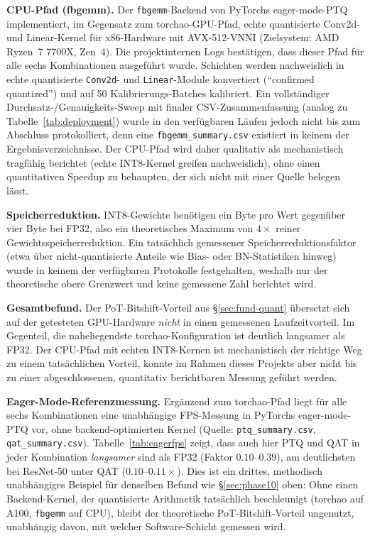 \textbf{CPU-Pfad (fbgemm).} Der \texttt{fbgemm}-Backend von PyTorchs eager-mode-PTQ implementiert, im Gegensatz zum torchao-GPU-Pfad, echte quantisierte Conv2d- und Linear-Kernel für x86-Hardware mit AVX-512-VNNI (Zielsystem: AMD Ryzen~7 7700X, Zen~4). Die projektinternen Logs bestätigen, dass dieser Pfad für alle sechs Kombinationen ausgeführt wurde. Schichten werden nachweislich in echte quantisierte \texttt{Conv2d}- und \texttt{Linear}-Module konvertiert (\enquote{confirmed quantized}) und auf 50 Kalibrierungs-Batches kalibriert. Ein vollständiger Durchsatz-/Genauigkeits-Sweep mit finaler CSV-Zusammenfassung (analog zu Tabelle~\ref{tab:deployment}) wurde in den verfügbaren Läufen jedoch nicht bis zum Abschluss protokolliert, denn eine \texttt{fbgemm\_summary.csv} existiert in keinem der Ergebnisverzeichnisse. Der CPU-Pfad wird daher qualitativ als mechanistisch tragfähig berichtet (echte INT8-Kernel greifen nachweislich), ohne einen quantitativen Speedup zu behaupten, der sich nicht mit einer Quelle belegen lässt.
\par\medskip

\textbf{Speicherreduktion.} INT8-Gewichte benötigen ein Byte pro Wert gegenüber vier Byte bei FP32, also ein theoretisches Maximum von $4\times$ reiner Gewichtsspeicherreduktion. Ein tatsächlich gemessener Speicherreduktionsfaktor (etwa über nicht-quantisierte Anteile wie Bias- oder BN-Statistiken hinweg) wurde in keinem der verfügbaren Protokolle festgehalten, weshalb nur der theoretische obere Grenzwert und keine gemessene Zahl berichtet wird.
\par\medskip

\textbf{Gesamtbefund.} Der PoT-Bitshift-Vorteil aus \S\ref{sec:fund-quant} übersetzt sich auf der getesteten GPU-Hardware \emph{nicht} in einen gemessenen Laufzeitvorteil. Im Gegenteil, die naheliegendste torchao-Konfiguration ist deutlich langsamer als FP32. Der CPU-Pfad mit echten INT8-Kernen ist mechanistisch der richtige Weg zu einem tatsächlichen Vorteil, konnte im Rahmen dieses Projekts aber nicht bis zu einer abgeschlossenen, quantitativ berichtbaren Messung geführt werden.
\par\medskip

\textbf{Eager-Mode-Referenzmessung.} Ergänzend zum torchao-Pfad liegt für alle sechs Kombinationen eine unabhängige FPS-Messung in PyTorchs eager-mode-PTQ vor, ohne backend-optimierten Kernel (Quelle: \texttt{ptq\_summary.csv}, \texttt{qat\_summary.csv}). Tabelle~\ref{tab:eagerfps} zeigt, dass auch hier PTQ und QAT in jeder Kombination \emph{langsamer} sind als FP32 (Faktor $0.10$--$0.39$), am deutlichsten bei ResNet-50 unter QAT ($0.10$--$0.11\times$). Dies ist ein drittes, methodisch unabhängiges Beispiel für denselben Befund wie \S\ref{sec:phase10} oben: Ohne einen Backend-Kernel, der quantisierte Arithmetik tatsächlich beschleunigt (torchao auf A100, \texttt{fbgemm} auf CPU), bleibt der theoretische PoT-Bitshift-Vorteil ungenutzt, unabhängig davon, mit welcher Software-Schicht gemessen wird.

